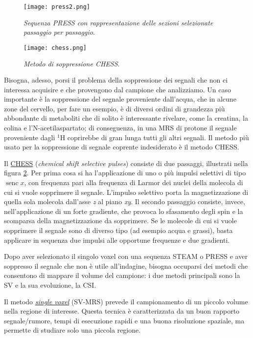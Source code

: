 \documentclass{report}
\newcommand{\figref}[1]{figura \ref{#1}}
\numberwithin{equation}{section}
\numberwithin{figure}{section}
\DeclareMathOperator{\senc}{senc}
\begin{document}
\begin{figure}[htp]
\centering
\texttt{[image: press2.png]}
\caption{\label{fig:press2} \textit{Sequenza PRESS con rappresentazione delle sezioni selezionate passaggio per passaggio}.}
\end{figure}

\begin{figure}[htp]
\centering
\texttt{[image: chess.png]}
\caption{\label{fig:chess} \textit{Metodo di soppressione CHESS}.}
\end{figure}

Bisogna, adesso, porsi il problema della soppressione dei segnali che non ci interessa acquisire e che provengono dal campione che analizziamo. Un caso importante è la soppressione del segnale proveniente dall'acqua, che in alcune zone del cervello, per fare un esempio, è di diversi ordini di grandezza più abbondante di metaboliti che di solito è interessante rivelare, come la creatina, la colina e l'N-acetilaspartato; di conseguenza, in una MRS di protone il segnale proveniente dagli $\mathrm{^1H}$ coprirebbe di gran lunga tutti gli altri segnali. Il metodo più usato per la soppressione di segnale coprente indesiderato è il metodo CHESS.

Il \underline{CHESS} (\textit{chemical shift selective pulses}) consiste di due passaggi, illustrati nella \figref{fig:chess}. Per prima cosa si ha l'applicazione di uno o più impulsi selettivi di tipo $\senc{x}$, con frequenza pari alla frequenza di Larmor dei nuclei della molecola di cui si vuole sopprimere il segnale. L'impulso selettivo porta la magnetizzazione di quella sola molecola dall'asse \textit{z} al piano \textit{xy}. Il secondo passaggio consiste, invece, nell'applicazione di un forte gradiente, che provoca lo sfasamento degli spin e la scomparsa della magnetizzazione da sopprimere. Se le molecole di cui si vuole sopprimere il segnale sono di diverso tipo (ad esempio acqua e grassi), basta applicare in sequenza due impulsi alle opportune frequenze e due gradienti. 

Dopo aver selezionato il singolo voxel con una sequenza STEAM o PRESS e aver soppresso il segnale che non è utile all'indagine, bisogna occuparsi dei metodi che consentono di mappare il volume del campione: i due metodi principali sono la SV e la sua evoluzione, la CSI.

Il metodo \underline{\textit{single voxel}} (SV-MRS) prevede il campionamento di un piccolo volume nella regione di interesse. Questa tecnica è caratterizzata da un buon rapporto segnale/rumore, tempi di esecuzione rapidi e una buona risoluzione spaziale, ma permette di studiare solo una piccola regione.
\end{document}
